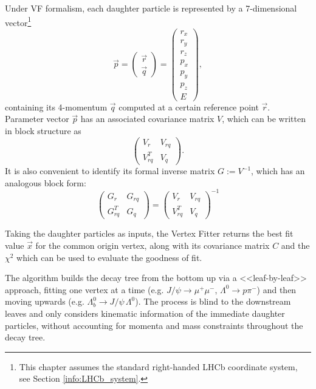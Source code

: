 Under VF formalism, each daughter particle is represented by a 7-dimensional vector\footnote{This chapter assumes the standard right-handed LHCb coordinate system, see Section \ref{info:LHCb_system}.}
\begin{equation}
	\vec{p} = \begin{pmatrix}
		\vec{r} \\ \vec{q}
	\end{pmatrix}
	=
	\begin{pmatrix}
		r_x \\ r_y \\ r_z \\ p_x \\ p_y \\ p_z \\ E
	\end{pmatrix},
	\label{eq:particle_representation}
\end{equation}
containing its 4-momentum $\vec{q}$ computed at a certain reference point $\vec{r}$.
Parameter vector $\vec{p}$ has an associated covariance matrix $V$, which can be written in block structure as
\begin{equation}
	\begin{pmatrix}
		V_r      & V_{rq} \\
		V_{rq}^T & V_q
	\end{pmatrix}.
	\label{eq:par_covmatrix}
\end{equation}
It is also convenient to identify its formal inverse matrix $G := V^{-1}$, which has an analogous block form:
\begin{equation}
	\begin{pmatrix}
		G_r      & G_{rq} \\
		G_{rq}^T & G_q
	\end{pmatrix}
	=
	\begin{pmatrix}
		V_r      & V_{rq} \\
		V_{rq}^T & V_q
	\end{pmatrix}^{-1}
\end{equation}

Taking the daughter particles as inputs, the Vertex Fitter returns the best fit value $\vec{x}$ for the common origin vertex, along with its covariance matrix $C$ and the $\chi^2$ which can be used to evaluate the goodness of fit.

The algorithm builds the decay tree from the bottom up via a <<leaf-by-leaf>> approach, fitting one vertex at a time (e.g. $J/\psi \rightarrow \mu^+ \mu^-$, $\Lambda^0 \rightarrow p \pi^-$) and then moving upwards (e.g. $\Lambda_b^0 \rightarrow J/\psi\,\Lambda^0$).
The process is blind to the downstream leaves and only considers kinematic information of the immediate daughter particles, without accounting for momenta and mass constraints throughout the decay tree.

